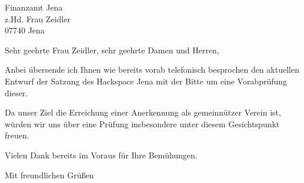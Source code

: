 \documentclass[fontsize=12pt,paper=a4,DIN]{scrlttr2}
\date{17. Januar 2012}
\begin{document}
\begin{letter}{Finanzamt Jena \\
z.Hd. Frau Zeidler \\
07740 Jena}


\opening{Sehr geehrte Frau Zeidler, sehr geehrte Damen und Herren,}

Anbei übersende ich Ihnen wie bereits vorab telefonisch besprochen
den aktuellen Entwurf der Satzung des Hackspace Jena mit der Bitte
um eine Vorabprüfung dieser.

Da unser Ziel die Erreichung einer Anerkennung als gemeinnützer
Verein ist, würden wir uns über eine Prüfung insbesondere unter
diesem Gesichtspunkt freuen.

Vielen Dank bereits im Voraus für Ihre Bemühungen.

\closing{Mit freundlichen Grüßen}

\end{letter}
\end{document}
